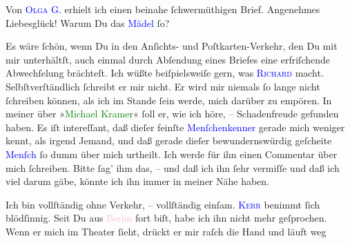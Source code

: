 \pstart
           Von \textsc{\textcolor{blue}{Olga G.}{}\ledrightnote{\textcolor{blue}{Olga Schnitzler}}} erhielt ich einen beinahe ſchwermüthigen Brief. Angenehmes Liebesglück! Warum
                  \label{K_L03055-3v}\label{K_L03055-3h} Du das \textcolor{blue}{Mädel}{}\ledrightnote{{$\rightarrow$}\textcolor{blue}{Olga Schnitzler}}
               ſo?\pend
           
\pstart
           Es wäre ſchön, wenn Du in den \strikeout{\textcolor{gray}{B}} Anſichts- und Poſtkarten-Verkehr, den Du mit mir unterhältſt, auch einmal
               durch Abſendung eines Briefes eine erfriſchende Abwechſelung brächteſt. Ich wüßte
               beiſpielsweiſe gern, was \textsc{\textcolor{blue}{Richard}{}\ledrightnote{\textcolor{blue}{Richard Beer-Hofmann}}} macht. Selbſtverſtändlich ſchreibt er mir nicht. Er wird mir niemals ſo lange
               nicht ſchreiben können, als {\pb}ich im Stande ſein
               werde, mich darüber zu empören. In meiner \label{K_L03055-4v}\label{K_L03055-4h} über »\textcolor{green}{Michael Kramer}{}\ledrightnote{\textcolor{green}{Michael Kramer. Drama}}« ſoll er, wie ich höre, –
               Schadenfreude gefunden haben. Es iſt intereſſant, daß dieſer feinſte \strikeout{\textcolor{gray}{×}\-\textcolor{gray}{×}\-\textcolor{gray}{×}\-\textcolor{gray}{×}}{ }\textcolor{blue}{Menſchenkenner}{}\ledrightnote{{$\rightarrow$}\textcolor{blue}{Richard Beer-Hofmann}} gerade mich
               weniger kennt, als irgend Jemand, und daß gerade dieſer bewundernswürdig geſcheite
                  \textcolor{blue}{Menſch}{}\ledrightnote{{$\rightarrow$}\textcolor{blue}{Richard Beer-Hofmann}} ſo dumm über mich
               urtheilt. Ich werde für ihn einen Commentar über mich ſchreiben. Bitte ſag’ ihm das,
               – und daß ich ihn ſehr vermiſſe und daß ich viel darum gäbe, könnte ich ihn immer in
               meiner Nähe haben.\pend
           
\pstart
           {\pb}Ich bin vollſtändig ohne Verkehr, – vollſtändig
               einſam. \textsc{\textcolor{blue}{Kerr}{}\ledrightnote{\textcolor{blue}{Alfred Kerr}}} benimmt ſich blödſinnig. Seit Du aus \textcolor{pink}{Berlin}{}\ledrightnote{\textcolor{pink}{Berlin}}
               fort biſt, habe ich ihn nicht mehr geſprochen. Wenn er mich im Theater ſieht, drückt
               er mir raſch die Hand und läuft weg{\dotssix}\pend
           
